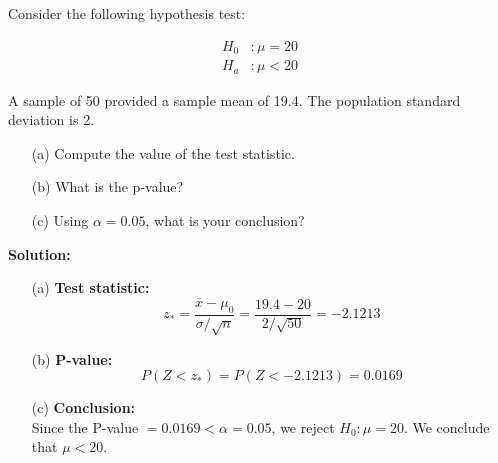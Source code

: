 \begin{example}

Consider the following hypothesis test:

\begin{align*}
H_0 &: \mu = 20 \\
H_a &: \mu < 20
\end{align*}


A sample of 50 provided a sample mean of 19.4. The population standard deviation is 2.

\begin{enumerate}
    \item[(a)] Compute the value of the test statistic.
    \item[(b)] What is the p-value?
    \item[(c)] Using $\alpha = 0.05$, what is your conclusion?
\end{enumerate}

\textbf{Solution:}

\begin{enumerate}
    \item[(a)] \textbf{Test statistic:}
    \[
    z_\ast = \frac{\bar{x} - \mu_0}{\sigma / \sqrt{n}} = \frac{19.4 - 20}{2 / \sqrt{50}} = -2.1213
    \]
    
    \item[(b)] \textbf{P-value:}
    \[
    P(Z < z_\ast) = P(Z < -2.1213) = 0.0169
    \]

    \item[(c)] \textbf{Conclusion:} \\
    Since the P-value $= 0.0169 < \alpha = 0.05$, we reject $H_0 : \mu = 20$. We conclude that $\mu < 20$.
\end{enumerate}

\end{example}
